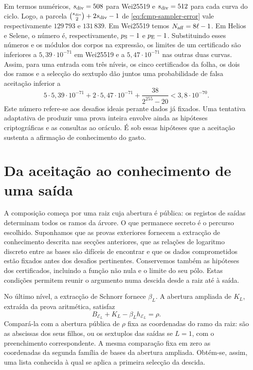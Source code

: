 Em termos numéricos, \(s_{\rm div}=508\) para Wei25519 e
\(s_{\rm div}=512\) para cada curva do ciclo. Logo, a parcela
\(\binom{s_{\rm div}}2+2s_{\rm div}-1\) de
\eqref{eq:fcmp-sampler-error} vale respectivamente
\(129\,793\) e \(131\,839\). Em Wei25519 temos
\(N_{\rm aff}=8\ell-1\). Em Helios e Selene, o número é,
respectivamente, \(p_{\rm S}-1\) e \(p_{\rm E}-1\).
Substituindo esses números e os módulos dos corpos na expressão,
os limites de um certificado são inferiores a
\(5{,}39\cdot10^{-71}\) em Wei25519 e a
\(5{,}47\cdot10^{-71}\) nas outras duas curvas.
Assim, para uma entrada com três níveis, os cinco certificados
da folha, os dois dos ramos e a selecção do sextuplo dão juntos
uma probabilidade de falsa aceitação inferior a
\[
 5\cdot5{,}39\cdot10^{-71}
 +2\cdot5{,}47\cdot10^{-71}
 +\frac{38}{2^{255}-20}< 3{,}8\cdot10^{-70}.
\]
Este número refere-se aos desafios ideais perante dados já fixados.
Uma tentativa adaptativa de produzir uma prova inteira envolve ainda
as hipóteses criptográficas e as consultas ao oráculo. É sob essas
hipóteses que a aceitação sustenta a afirmação de conhecimento do gasto.

\section{Da aceitação ao conhecimento de uma saída}
\label{sec:fcmp-composed-security}
\label{sec:fcmp-authorization-and-privacy}

A composição começa por uma raiz cuja abertura é pública:
os registos de saídas determinam todos os ramos da árvore.
O que permanece secreto é o percurso escolhido. Suponhamos
que as provas exteriores fornecem a extracção de conhecimento
descrita nas secções anteriores, que as relações de logaritmo
discreto entre as bases são difíceis de encontrar e que
os dados comprometidos estão fixados antes dos desafios
pertinentes. Conservemos também as hipóteses dos certificados,
incluindo a função não nula e o limite do seu pólo.
Estas condições permitem reunir o argumento numa descida
desde a raiz até à saída.

No último nível, a extracção de Schnorr fornece
\(\beta_L\). A abertura ampliada de \(K_L\), extraída
da prova aritmética, satisfaz
\[
 B_{\mathcal E_L}+K_L-\beta_Lh_{\mathcal E_L}=\rho.
\]
Compará-la com a abertura pública de \(\rho\) fixa as
coordenadas do ramo da raiz: são as abscissas dos seus
filhos, ou os sextuplos das saídas se \(L=1\), com o
preenchimento correspondente. A mesma comparação fixa
em zero as coordenadas da segunda família de bases da
abertura ampliada. Obtém-se, assim, uma lista conhecida
à qual se aplica a primeira selecção da descida.

